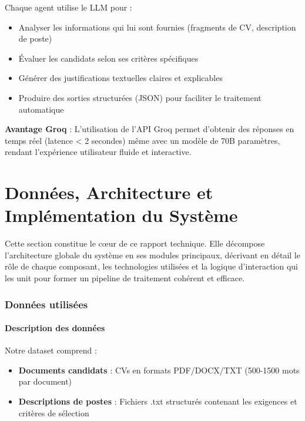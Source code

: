 \documentclass{rapportECL}
\begin{document}
Chaque agent utilise le LLM pour :
\begin{itemize}[leftmargin=*]
    \item Analyser les informations qui lui sont fournies (fragments de CV, description de poste)
    \item Évaluer les candidats selon ses critères spécifiques
    \item Générer des justifications textuelles claires et explicables
    \item Produire des sorties structurées (JSON) pour faciliter le traitement automatique
\end{itemize}

\begin{importantbox}
\textbf{Avantage Groq} : L'utilisation de l'API Groq permet d'obtenir des réponses en temps réel (latence < 2 secondes) même avec un modèle de 70B paramètres, rendant l'expérience utilisateur fluide et interactive.
\end{importantbox}

\newpage

\part{Données, Architecture et Implémentation du Système}

Cette section constitue le cœur de ce rapport technique. Elle décompose l'architecture globale du système en ses modules principaux, décrivant en détail le rôle de chaque composant, les technologies utilisées et la logique d'interaction qui les unit pour former un pipeline de traitement cohérent et efficace.

\section{Données utilisées}

\subsection{Description des données}

Notre dataset comprend :

\begin{itemize}[leftmargin=*]
    \item \textbf{Documents candidats} : CVs en formats PDF/DOCX/TXT (500-1500 mots par document)
    \item \textbf{Descriptions de postes} : Fichiers .txt structurés contenant les exigences et critères de sélection
\end{itemize}
\end{document}
